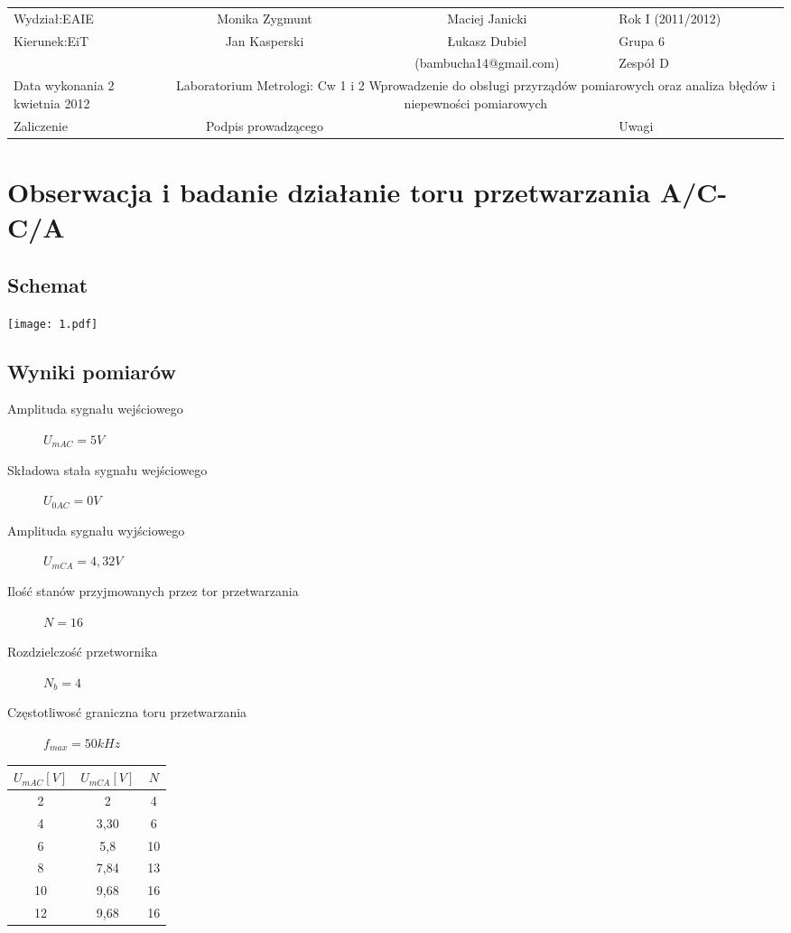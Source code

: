 \documentclass[11pt]{article}
\begin{document}
\begin{tabular}{|p{2.8cm}|cc|l|}
\hline
	Wydział:EAIE & Monika Zygmunt & Maciej Janicki & Rok I (2011/2012) \\
        \cline{4-4}
        Kierunek:EiT & Jan Kasperski  & Łukasz Dubiel & Grupa 6\\
        \cline{4-4}
        & & (bambucha14@gmail.com) & Zespół D\\
\hline
	Data wykonania 2 kwietnia 2012&
        \multicolumn{3}{|p{12cm}|}{Laboratorium Metrologi: Cw 1 i 2
	Wprowadzenie do obsługi przyrządów pomiarowych 
	oraz analiza błędów i niepewności pomiarowych} \\
        
\hline
	Zaliczenie & Podpis prowadzącego & & Uwagi\\
\hline
\end{tabular}
\section{Obserwacja i badanie działanie toru przetwarzania A/C-C/A}
\subsection{Schemat}

\begin{center}
\texttt{[image: 1.pdf]}
\end{center}

\subsection{Wyniki pomiarów}
\begin{description}
\item[Amplituda sygnału wejściowego] $U_{mAC} = 5 V $ 
\item[Składowa stała sygnału wejściowego] $U_{0AC} = 0 V $
\item[Amplituda sygnału wyjściowego] $U_{mCA} = 4,32 V $
\item[Ilość stanów przyjmowanych przez tor przetwarzania] $N = 16 $
\item[Rozdzielczość przetwornika] $ N_b = 4 $ 
\item[Częstotliwosć graniczna toru przetwarzania] $ f_{max} = 50kHz $
\end{description}

\begin{center}
\begin{tabular}{|c|c|c|}
\hline
$U_{mAC} [V]$ & $U_{mCA} [V] $ & $N$ \\
\hline
 2 & 2 & 4 \\
\hline
 4 & 3,30 & 6 \\
\hline
 6 & 5,8 & 10 \\
\hline
 8 & 7,84 & 13 \\
\hline
 10 & 9,68 & 16 \\
\hline
 12 & 9,68 & 16 \\
\hline
\end{tabular}
\end{center}
\end{document}
